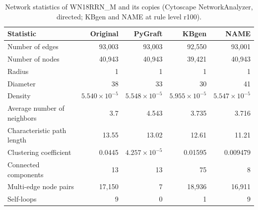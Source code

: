 \begin{table}[t]
\centering
\caption{Network statistics of WN18RRN\_M and its copies (Cytoscape NetworkAnalyzer, directed; KBgen and NAME at rule level r100).}
\label{tab:cytoscape_WN18RRN_M}
\begin{tabular}{lrrrr}
\toprule
Statistic & Original & PyGraft & KBgen & NAME \\
\midrule
Number of edges & 93{,}003 & 93{,}003 & 92{,}550 & 93{,}001 \\
Number of nodes & 40{,}943 & 40{,}943 & 39{,}421 & 40{,}943 \\
Radius & 1 & 1 & 1 & 1 \\
Diameter & 38 & 33 & 30 & 41 \\
Density & $5.540\times10^{-5}$ & $5.548\times10^{-5}$ & $5.955\times10^{-5}$ & $5.547\times10^{-5}$ \\
Average number of neighbors & 3.7 & 4.543 & 3.735 & 3.716 \\
Characteristic path length & 13.55 & 13.02 & 12.61 & 11.21 \\
Clustering coefficient & 0.0445 & $4.257\times10^{-5}$ & 0.01595 & 0.009479 \\
Connected components & 13 & 13 & 75 & 8 \\
Multi-edge node pairs & 17{,}150 & 7 & 18{,}936 & 16{,}911 \\
Self-loops & 9 & 0 & 1 & 9 \\
\bottomrule
\end{tabular}
\end{table}
